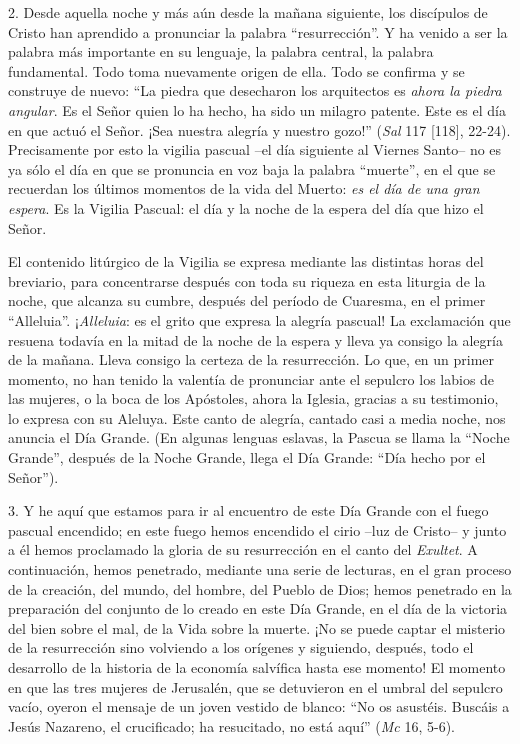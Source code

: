 			\begin{body}2. Desde aquella noche y más aún desde la mañana siguiente, los discípulos de Cristo han aprendido a pronunciar la palabra “resurrección”. Y ha venido a ser la palabra más importante en su lenguaje, la palabra central, la palabra fundamental. Todo toma nuevamente origen de ella. Todo se confirma y se construye de nuevo: “La piedra que desecharon los arquitectos es \textit{ahora la piedra angular}. Es el Señor quien lo ha hecho, ha sido un milagro patente. Este es el día en que actuó el Señor. ¡Sea nuestra alegría y nuestro gozo!” (\textit{Sal} 117 [118], 22-24). Precisamente por esto la vigilia pascual –el día siguiente al Viernes Santo– no es ya sólo el día en que se pronuncia en voz baja la palabra “muerte”, en el que se recuerdan los últimos momentos de la vida del Muerto: \textit{es el día de una gran espera}. Es la Vigilia Pascual: el día y la noche de la espera del día que hizo el Señor.\end{body}
			
			\begin{body}El contenido litúrgico de la Vigilia se expresa mediante las distintas horas del breviario, para concentrarse después con toda su riqueza en esta liturgia de la noche, que alcanza su cumbre, después del período de Cuaresma, en el primer “Alleluia”. ¡\textit{Alleluia}: es el grito que expresa la alegría pascual! La exclamación que resuena todavía en la mitad de la noche de la espera y lleva ya consigo la alegría de la mañana. Lleva consigo la certeza de la resurrección. Lo que, en un primer momento, no han tenido la valentía de pronunciar ante el sepulcro los labios de las mujeres, o la boca de los Apóstoles, ahora la Iglesia, gracias a su testimonio, lo expresa con su Aleluya. Este canto de alegría, cantado casi a media noche, nos anuncia el Día Grande. (En algunas lenguas eslavas, la Pascua se llama la “Noche Grande”, después de la Noche Grande, llega el Día Grande: “Día hecho por el Señor”).\end{body}
			
			\begin{body}3. Y he aquí que estamos para ir al encuentro de este Día Grande con el fuego pascual encendido; en este fuego hemos encendido el cirio –luz de Cristo– y junto a él hemos proclamado la gloria de su resurrección en el canto del \textit{Exultet}. A continuación, hemos penetrado, mediante una serie de lecturas, en el gran proceso de la creación, del mundo, del hombre, del Pueblo de Dios; hemos penetrado en la preparación del conjunto de lo creado en este Día Grande, en el día de la victoria del bien sobre el mal, de la Vida sobre la muerte. ¡No se puede captar el misterio de la resurrección sino volviendo a los orígenes y siguiendo, después, todo el desarrollo de la historia de la economía salvífica hasta ese momento! El momento en que las tres mujeres de Jerusalén, que se detuvieron en el umbral del sepulcro vacío, oyeron el mensaje de un joven vestido de blanco: “No os asustéis. Buscáis a Jesús Nazareno, el crucificado; ha resucitado, no está aquí” (\textit{Mc} 16, 5-6).\end{body}
			
